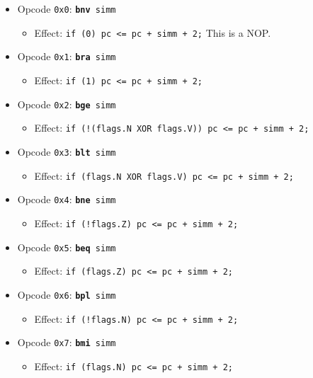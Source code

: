 \documentclass{article}
\begin{document}
	\singlespacing
	\begin{itemize}
		\item Opcode \texttt{0x0}:
			\texttt{\textbf{bnv} simm}
		\begin{itemize}
			\item Effect:
				\texttt{if (0) pc <= pc + simm + 2;} This is a NOP.
		\end{itemize}
		\item Opcode \texttt{0x1}:
			\texttt{\textbf{bra} simm}
		\begin{itemize}
			\item Effect:
				\texttt{if (1) pc <= pc + simm + 2;}
		\end{itemize}
		\item Opcode \texttt{0x2}:
			\texttt{\textbf{bge} simm}
		\begin{itemize}
			\item Effect:
				\texttt{if (!(flags.N XOR flags.V)) pc <= pc + simm + 2;}
		\end{itemize}
		\item Opcode \texttt{0x3}:
			\texttt{\textbf{blt} simm}
		\begin{itemize}
			\item Effect:
				\texttt{if (flags.N XOR flags.V) pc <= pc + simm + 2;}
		\end{itemize}
		\item Opcode \texttt{0x4}:
			\texttt{\textbf{bne} simm}
		\begin{itemize}
			\item Effect:
				\texttt{if (!flags.Z) pc <= pc + simm + 2;}
		\end{itemize}
		\item Opcode \texttt{0x5}:
			\texttt{\textbf{beq} simm}
		\begin{itemize}
			\item Effect:
				\texttt{if (flags.Z) pc <= pc + simm + 2;}
		\end{itemize}
		\item Opcode \texttt{0x6}:
			\texttt{\textbf{bpl} simm}
		\begin{itemize}
			\item Effect:
				\texttt{if (!flags.N) pc <= pc + simm + 2;}
		\end{itemize}
		\item Opcode \texttt{0x7}:
			\texttt{\textbf{bmi} simm}
		\begin{itemize}
			\item Effect:
				\texttt{if (flags.N) pc <= pc + simm + 2;}
		\end{itemize}

\end{itemize}
\end{document}
